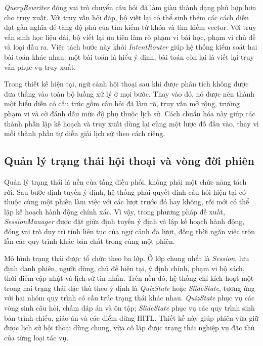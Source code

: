 \documentclass[../DoAn.tex]{subfiles}
\begin{document}
\textit{QueryRewriter} đóng vai trò chuyển câu hỏi đã làm giàu thành dạng phù hợp hơn cho truy xuất. Với truy vấn hỏi đáp, bộ viết lại có thể sinh thêm các cách diễn đạt gần nghĩa để tăng độ phủ của tìm kiếm từ khóa và tìm kiếm vector. Với truy vấn sinh học liệu dài, bộ viết lại ưu tiên làm rõ phạm vi bài học, phạm vi chủ đề và loại đầu ra. Việc tách bước này khỏi \textit{IntentRouter} giúp hệ thống kiểm soát hai bài toán khác nhau: một bài toán là hiểu ý định, bài toán còn lại là viết lại truy vấn phục vụ truy xuất.

Trong thiết kế hiện tại, ngữ cảnh hội thoại sau khi được phân tích không được đưa thẳng vào toàn bộ luồng xử lý ở mọi bước. Thay vào đó, nó được nén thành một biểu diễn có cấu trúc gồm câu hỏi đã làm rõ, truy vấn mở rộng, trường phạm vi và cờ đánh dấu mức độ phụ thuộc lịch sử. Cách chuẩn hóa này giúp các thành phần lập kế hoạch và truy xuất dùng lại cùng một lược đồ đầu vào, thay vì mỗi thành phần tự diễn giải lịch sử theo cách riêng.

\subsection{Quản lý trạng thái hội thoại và vòng đời phiên}

Quản lý trạng thái là nền của tầng điều phối, không phải một chức năng tách rời. Sau bước định tuyến ý định, hệ thống phải quyết định câu hỏi hiện tại có thuộc cùng một phiên làm việc với các lượt trước đó hay không, rồi mới có thể lập kế hoạch hành động chính xác. Vì vậy, trong phương pháp đề xuất, \textit{SessionManager} được đặt giữa định tuyến ý định và lập kế hoạch hành động, đóng vai trò duy trì tính liên tục của ngữ cảnh đa lượt, đồng thời ngăn việc trộn lẫn các quy trình khác bản chất trong cùng một phiên.

Mô hình trạng thái được tổ chức theo ba lớp. Ở lớp chung nhất là \textit{Session}, lưu định danh phiên, người dùng, chủ đề hiện tại, ý định chính, phạm vi bộ sách, thời điểm cập nhật và lịch sử tin nhắn. Trên nền đó, hệ thống chỉ kích hoạt một trong hai trạng thái đặc thù theo ý định là \textit{QuizState} hoặc \textit{SlideState}, tương ứng với hai nhóm quy trình có cấu trúc trạng thái khác nhau. \textit{QuizState} phục vụ các vòng sinh câu hỏi, chấm đáp án và ôn tập; \textit{SlideState} phục vụ các quy trình sinh bản trình chiếu, giáo án và các điểm dừng HITL. Thiết kế này giúp phiên vừa giữ được lịch sử hội thoại dùng chung, vừa cô lập được trạng thái nghiệp vụ đặc thù của từng loại tác vụ.
\end{document}
